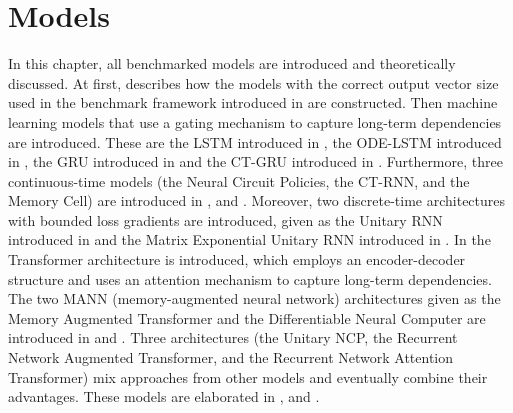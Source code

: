 \documentclass[draft,final]{vutinfth} %
\begin{document}


    \chapter{Models}
    In this chapter, all benchmarked models are introduced and theoretically discussed.
    At first,  describes how the models with the correct output vector size used in the benchmark framework introduced in  are constructed.
    Then machine learning models that use a gating mechanism to capture long-term dependencies are introduced.
    These are the LSTM introduced in , the ODE-LSTM introduced in , the GRU introduced in  and the CT-GRU introduced in .
    Furthermore, three continuous-time models (the Neural Circuit Policies, the CT-RNN, and the Memory Cell) are introduced in ,  and .
    Moreover, two discrete-time architectures with bounded loss gradients are introduced, given as the Unitary RNN introduced in  and the Matrix Exponential Unitary RNN introduced in .
    In  the Transformer architecture is introduced, which employs an encoder-decoder structure and uses an attention mechanism to capture long-term dependencies.
    The two MANN (memory-augmented neural network) architectures given as the Memory Augmented Transformer and the Differentiable Neural Computer are introduced in  and .
    Three architectures (the Unitary NCP, the Recurrent Network Augmented Transformer, and the Recurrent Network Attention Transformer) mix approaches from other models and eventually combine their advantages.
    These models are elaborated in ,  and .
\end{document}
